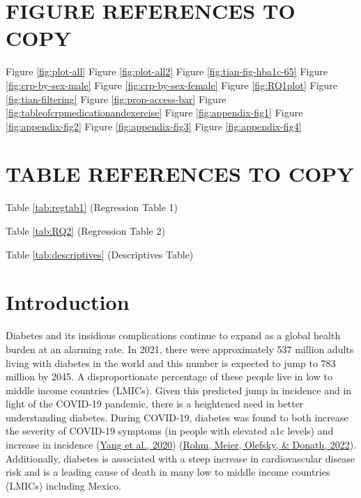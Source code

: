 \documentclass[
  man]{apa6}
\begin{document}
\hypertarget{figure-references-to-copy}{%
\section{FIGURE REFERENCES TO COPY}\label{figure-references-to-copy}}

Figure \ref{fig:plot-all}
Figure \ref{fig:plot-all2}
Figure \ref{fig:tian-fig-hba1c-65}
Figure \ref{fig:crp-by-sex-male}
Figure \ref{fig:crp-by-sex-female}
Figure \ref{fig:RQ1plot}
Figure \ref{fig:tian-filtering}
Figure \ref{fig:prop-access-bar}
Figure \ref{fig:tableofcrpmedicationandexercise}
Figure \ref{fig:appendix-fig1}
Figure \ref{fig:appendix-fig2}
Figure \ref{fig:appendix-fig3}
Figure \ref{fig:appendix-fig4}

\hypertarget{table-references-to-copy}{%
\section{TABLE REFERENCES TO COPY}\label{table-references-to-copy}}

Table \ref{tab:regtab1} (Regression Table 1)

Table \ref{tab:RQ2} (Regression Table 2)

Table \ref{tab:descriptives} (Descriptives Table)

\hypertarget{introduction}{%
\section{Introduction}\label{introduction}}

Diabetes and its insidious complications continue to expand as a global health burden at an alarming rate. In 2021, there were approximately 537 million adults living with diabetes in the world and this number is expected to jump to 783 million by 2045. A disproportionate percentage of these people live in low to middle income countries (LMICs). Given this predicted jump in incidence and in light of the COVID-19 pandemic, there is a heightened need in better understanding diabetes. During COVID-19, diabetes was found to both increase the severity of COVID-19 symptoms (in people with elevated a1c levels) and increase in incidence (\protect\hyperlink{ref-yangPrevalenceComorbiditiesIts2020}{Yang et al., 2020}) (\protect\hyperlink{ref-rohmInflammationObesityDiabetes2022}{Rohm, Meier, Olefsky, \& Donath, 2022}). Additionally, diabetes is associated with a steep increase in cardiovascular disease risk and is a leading cause of death in many low to middle income countries (LMICs) including Mexico.
\end{document}

